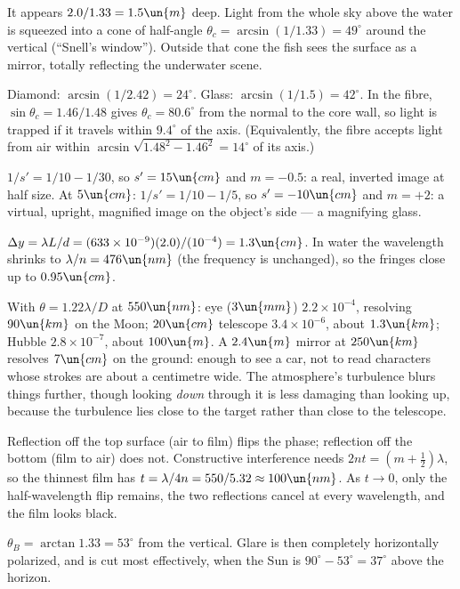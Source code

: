 
 It appears $2.0/1.33 = 1.5\un{m}$ deep. Light from the whole sky above the water is squeezed into a cone of half-angle $\theta_c = \arcsin(1/1.33) = 49^\circ$ around the vertical (``Snell's window''). Outside that cone the fish sees the surface as a mirror, totally reflecting the underwater scene.

 Diamond: $\arcsin(1/2.42) = 24^\circ$. Glass: $\arcsin(1/1.5) = 42^\circ$. In the fibre, $\sin\theta_c = 1.46/1.48$ gives $\theta_c = 80.6^\circ$ from the normal to the core wall, so light is trapped if it travels within $9.4^\circ$ of the axis. (Equivalently, the fibre accepts light from air within $\arcsin\sqrt{1.48^2-1.46^2} = 14^\circ$ of its axis.)

 $1/s' = 1/10 - 1/30$, so $s' = 15\un{cm}$ and $m = -0.5$: a real, inverted image at half size. At $5\un{cm}$: $1/s' = 1/10-1/5$, so $s' = -10\un{cm}$ and $m = +2$: a virtual, upright, magnified image on the object's side --- a magnifying glass.

 $\Delta y = \lambda L/d = (633\times10^{-9})(2.0)/(10^{-4}) = 1.3\un{cm}$. In water the wavelength shrinks to $\lambda/n = 476\un{nm}$ (the frequency is unchanged), so the fringes close up to $0.95\un{cm}$.

 With $\theta = 1.22\lambda/D$ at $550\un{nm}$: eye ($3\un{mm}$) $2.2\times10^{-4}$, resolving $90\un{km}$ on the Moon; $20\un{cm}$ telescope $3.4\times10^{-6}$, about $1.3\un{km}$; Hubble $2.8\times10^{-7}$, about $100\un{m}$. A $2.4\un{m}$ mirror at $250\un{km}$ resolves $7\un{cm}$ on the ground: enough to see a car, not to read characters whose strokes are about a centimetre wide. The atmosphere's turbulence blurs things further, though looking \emph{down} through it is less damaging than looking up, because the turbulence lies close to the target rather than close to the telescope.

 Reflection off the top surface (air to film) flips the phase; reflection off the bottom (film to air) does not. Constructive interference needs $2nt = (m+\tfrac12)\lambda$, so the thinnest film has $t = \lambda/4n = 550/5.32\approx100\un{nm}$. As $t\to0$, only the half-wavelength flip remains, the two reflections cancel at every wavelength, and the film looks black.

 $\theta_B = \arctan1.33 = 53^\circ$ from the vertical. Glare is then completely horizontally polarized, and is cut most effectively, when the Sun is $90^\circ-53^\circ = 37^\circ$ above the horizon.


